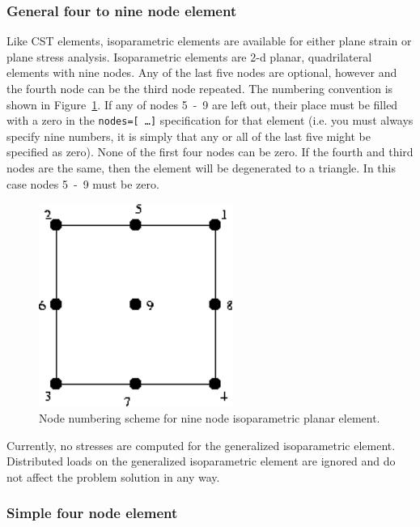 \subsubsection{General four to nine node element}

Like CST elements, isoparametric elements are available for either 
plane strain or plane stress analysis.  Isoparametric elements are 2-d planar, 
quadrilateral elements with nine nodes.  Any of the last five nodes are 
optional, however and the fourth node can be the third node repeated.  
The numbering convention is shown in Figure~\ref{elements.iso_numbers}.  
If any of nodes \mbox{5 - 9} are left out, 
their place must be filled with a zero in the {\tt nodes=[ \dots ]} 
specification for that element (i.e. you must always specify nine numbers, it 
is simply that 
any or all of the last five might be specified as zero).  None of the first 
four nodes can be zero.  If the fourth and third nodes are the same, then the 
element will be degenerated to a triangle.  In this case nodes \mbox{5 - 9}
must be zero.	

\begin{figure}
 \begin{center}
  \includegraphics[width=2.5in]{figures/iso_numbers}
 \end{center}
 \caption{Node numbering scheme for nine node isoparametric planar element.}
 \label{elements.iso_numbers}
\end{figure} 

Currently, no stresses are computed for the generalized isoparametric element.
Distributed loads on the generalized isoparametric element are ignored and do 
not affect the problem solution in any way.


\subsubsection{Simple four node element}

